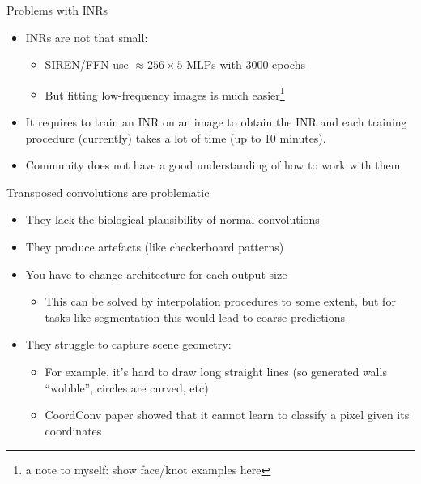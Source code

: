 \documentclass[10pt, handout]{beamer}
\begin{document}
\begin{frame}{Problems with INRs}
\begin{itemize}
    \item\pause INRs are not that small:
    \begin{itemize}
        \item\pause SIREN/FFN use $\approx 256\times 5$ MLPs with 3000 epochs
        \item\pause But fitting low-frequency images is much easier\footnote{a note to myself: show face/knot examples here}
    \end{itemize}
    \item\pause It requires to train an INR on an image to obtain the INR and each training procedure (currently) takes a lot of time (up to 10 minutes).
    \item\pause Community does not have a good understanding of how to work with them
\end{itemize}
\end{frame}


\begin{frame}{Transposed convolutions are problematic}
\begin{itemize}
    \item\pause They lack the biological plausibility of normal convolutions
    \item\pause They produce artefacts (like checkerboard patterns)
    \item\pause You have to change architecture for each output size
    \begin{itemize}
        \item\pause This can be solved by interpolation procedures to some extent, but for tasks like segmentation this would lead to coarse predictions
    \end{itemize}
    \item\pause They struggle to capture scene geometry:
    \begin{itemize}
        \item\pause For example, it's hard to draw long straight lines (so generated walls ``wobble'', circles are curved, etc)
        \item\pause CoordConv paper showed that it cannot learn to classify a pixel given its coordinates
    \end{itemize}
\end{itemize}
\end{frame}
\end{document}
